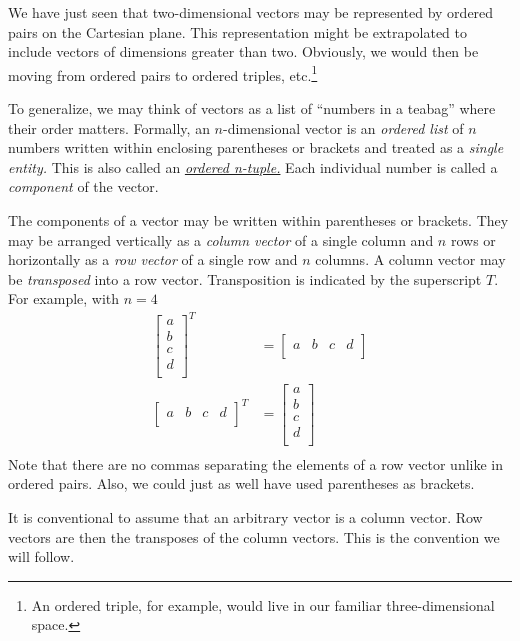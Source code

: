 \documentclass[
  a4paper,
]{article}
\begin{document}
We have just seen that two-dimensional vectors may be represented by
ordered pairs on the Cartesian plane. This representation might be
extrapolated to include vectors of dimensions greater than two.
Obviously, we would then be moving from ordered pairs to ordered
triples, etc.\footnote{An ordered triple, for example, would live in our
  familiar three-dimensional space.}

To generalize, we may think of vectors as a list of ``numbers in a
teabag'' where their order matters. Formally, an \(n\)-dimensional
vector is an \emph{ordered list} of \(n\) numbers written within
enclosing parentheses or brackets and treated as a \emph{single entity.}
This is also called an
\href{http://en.wikipedia.org/wiki/Tuple}{\emph{ordered n-tuple.}} Each
individual number is called a \emph{component} of the vector.

The components of a vector may be written within parentheses or
brackets. They may be arranged vertically as a \emph{column vector} of a
single column and \(n\) rows or horizontally as a \emph{row vector} of a
single row and \(n\) columns. A column vector may be \emph{transposed}
into a row vector. Transposition is indicated by the superscript \(T\).
For example, with \(n = 4\) \[
\begin{aligned}
\begin{bmatrix}a\\b\\c\\d\\\end{bmatrix}^{T} & = \begin{bmatrix}a&b&c&d\\\end{bmatrix}\\
\begin{bmatrix}a&b&c&d\\\end{bmatrix}^{T} & = \begin{bmatrix}a\\b\\c\\d\\\end{bmatrix}\\
\end{aligned}
\] Note that there are no commas separating the elements of a row vector
unlike in ordered pairs. Also, we could just as well have used
parentheses as brackets.

It is conventional to assume that an arbitrary vector is a column
vector. Row vectors are then the transposes of the column vectors. This
is the convention we will follow.
\end{document}
